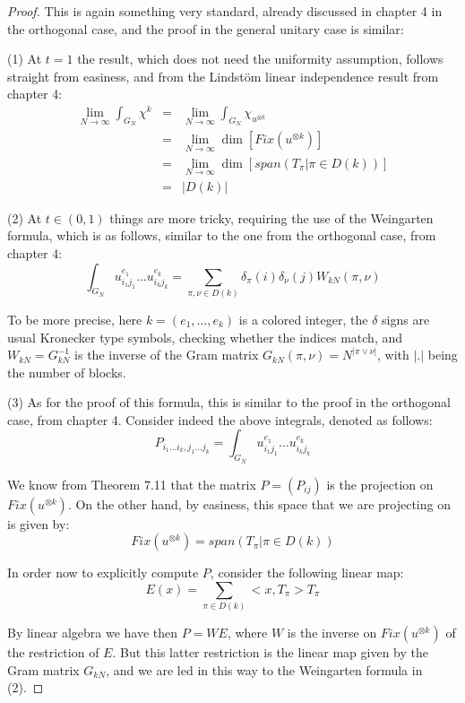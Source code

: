 \documentclass[12pt]{amsbook}
\begin{document}
\begin{proof}
This is again something very standard, already discussed in chapter 4 in the orthogonal case, and the proof in the general unitary case is similar:

\medskip

(1) At $t=1$ the result, which does not need the uniformity assumption, follows straight from easiness, and from the Lindst\"om linear independence result from chapter 4:
\begin{eqnarray*}
\lim_{N\to\infty}\int_{G_N}\chi^k
&=&\lim_{N\to\infty}\int_{G_N}\chi_{u^{\otimes k}}\\
&=&\lim_{N\to\infty}\dim\left[Fix(u^{\otimes k})\right]\\
&=&\lim_{N\to\infty}\dim\left[span\left(T_\pi\Big|\pi\in D(k)\right)\right]\\
&=&|D(k)|
\end{eqnarray*}

(2) At $t\in(0,1)$ things are more tricky, requiring the use of the Weingarten formula, which is as follows, similar to the one from the orthogonal case, from chapter 4:
$$\int_{G_N}u_{i_1j_1}^{e_1}\ldots u_{i_kj_k}^{e_k}=\sum_{\pi,\nu\in D(k)}\delta_\pi(i)\delta_\nu(j)W_{kN}(\pi,\nu)$$

To be more precise, here $k=(e_1,\ldots,e_k)$ is a colored integer, the $\delta$ signs are usual Kronecker type symbols, checking whether the indices match, and $W_{kN}=G_{kN}^{-1}$ is the inverse of the Gram matrix $G_{kN}(\pi,\nu)=N^{|\pi\vee\nu|}$, with $|.|$ being the number of blocks. 

\medskip

(3) As for the proof of this formula, this is similar to the proof in the orthogonal case, from chapter 4. Consider indeed the above integrals, denoted as follows:
$$P_{i_1\ldots i_k,j_1\ldots j_k}=\int_{G_N}u_{i_1j_1}^{e_1}\ldots u_{i_kj_k}^{e_k}$$

We know from Theorem 7.11 that the matrix $P=(P_{ij})$ is the projection on $Fix(u^{\otimes k})$. On the other hand, by easiness, this space that we are projecting on is given by:
$$Fix(u^{\otimes k})=span\left(T_\pi\Big|\pi\in D(k)\right)$$

In order now to explicitly compute $P$, consider the following linear map:
$$E(x)=\sum_{\pi\in D(k)}<x,T_\pi>T_\pi$$

By linear algebra we have then $P=WE$, where $W$ is the inverse on $Fix(u^{\otimes k})$ of the restriction of $E$. But this latter restriction is the linear map given by the Gram matrix $G_{kN}$, and we are led in this way to the Weingarten formula in (2).


\end{proof}
\end{document}
